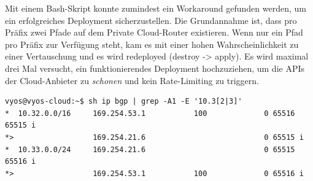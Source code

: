 Mit einem Bash-Skript konnte zumindest ein Workaround gefunden werden, um ein erfolgreiches Deployment sicherzustellen. Die Grundannahme ist, dass pro Präfix zwei Pfade auf dem Private Cloud-Router existieren. Wenn nur ein Pfad pro Präfix zur Verfügung steht, kam es mit einer hohen Wahrscheinlichkeit zu einer Vertauschung und es wird redeployed (destroy -> apply). Es wird maximal drei Mal versucht, ein funktionierendes Deployment hochzuziehen, um die APIs der Cloud-Anbieter zu \textit{schonen} und kein Rate-Limiting zu triggern.

\begin{lstlisting}[label=tf-base-deployment-bgp-ok,caption=BGP Status]
vyos@vyos-cloud:~$ sh ip bgp | grep -A1 -E '10.3[2|3]'
*  10.32.0.0/16     169.254.53.1           100             0 65516 65515 i
*>                  169.254.21.6                           0 65515 i
*  10.33.0.0/24     169.254.21.6                           0 65515 65516 i
*>                  169.254.53.1           100             0 65516 i
\end{lstlisting}

